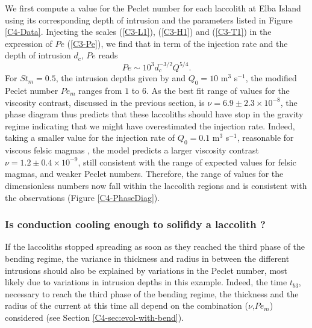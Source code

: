 We first compute  a value for the Peclet number  for each laccolith at
Elba  Island  using  its  corresponding depth  of  intrusion  and  the
parameters  listed  in  Figure \ref{C4-Data}.   Injecting  the  scales
(\ref{C3-L1}), (\ref{C3-H1})  and (\ref{C3-T1})  in the  expression of
$Pe$ (\ref{C3-Pe}), we find that in term of the injection rate and the
depth of intrusion $d_c$, $Pe$ reads
\begin{equation}
  Pe \sim 10^3 d_c^{-3/2} Q^{5/4}.
\end{equation}
For $St_m  =0.5$, the intrusion depths  given by \citet{Rocchi:2002jy}
and  $Q_0 =10$  m$^{3}$ s$^{-1}$,  the modified  Peclet number  $Pe_m$
ranges from  $1$ to  $6$.  As  the best  fit range  of values  for the
viscosity   contrast,   discussed   in  the   previous   section,   is
$\nu =  6.9\pm 2.3  \times 10^{-8}$, the  phase diagram  thus predicts
that  these  laccoliths  should  have   stop  in  the  gravity  regime
indicating  that  we  might  have overestimated  the  injection  rate.
Indeed, taking  a smaller  value for the  injection rate  of $Q_0=0.1$
m$^{3}$    s$^{-1}$,   reasonable    for    viscous   felsic    magmas
\citep{Harris:2000jd}, the model predicts  a larger viscosity contrast
$\nu=1.2\pm0.4\times  10^{-9}$, still  consistent  with  the range  of
expected    values   for    felsic   magmas,    and   weaker    Peclet
numbers. Therefore, the range of  values for the dimensionless numbers
now  fall within  the laccolith  regions  and is  consistent with  the
observations (Figure \ref{C4-PhaseDiag}).

\subsubsection*{Is   conduction   cooling   enough   to   solifidy   a
  laccolith ?}

If the laccoliths stopped spreading as  soon as they reached the third
phase of the  bending regime, the variance in thickness  and radius in
between  the   different  intrusions  should  also   be  explained  by
variations  in the  Peclet number,  most likely  due to  variations in
intrusion  depths  in  this   example.   Indeed,  the  time  $t_{b3}$,
necessary  to  reach  the  third  phase of  the  bending  regime,  the
thickness and the radius of the current at this time all depend on the
combination      ($\nu$,$Pe_m$)      considered      (see      Section
\ref{C4-sec:evol-with-bend}).

